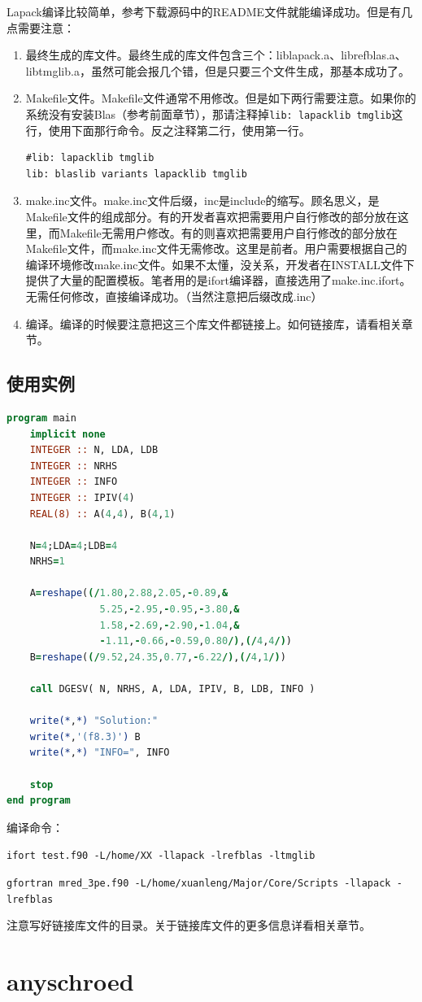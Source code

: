 Lapack编译比较简单，参考下载源码中的README文件就能编译成功。但是有几点需要注意：
\begin{enumerate}[(1)]
\item 最终生成的库文件。最终生成的库文件包含三个：liblapack.a、librefblas.a、libtmglib.a，虽然可能会报几个错，但是只要三个文件生成，那基本成功了。
\item Makefile文件。Makefile文件通常不用修改。但是如下两行需要注意。如果你的系统没有安装Blas（参考前面章节），那请注释掉\verb|lib: lapacklib tmglib|这行，使用下面那行命令。反之注释第二行，使用第一行。
\begin{verbatim}
#lib: lapacklib tmglib
lib: blaslib variants lapacklib tmglib
\end{verbatim}
\item make.inc文件。make.inc文件后缀，inc是include的缩写。顾名思义，是Makefile文件的组成部分。有的开发者喜欢把需要用户自行修改的部分放在这里，而Makefile无需用户修改。有的则喜欢把需要用户自行修改的部分放在Makefile文件，而make.inc文件无需修改。这里是前者。用户需要根据自己的编译环境修改make.inc文件。如果不太懂，没关系，开发者在INSTALL文件下提供了大量的配置模板。笔者用的是ifort编译器，直接选用了make.inc.ifort。无需任何修改，直接编译成功。（当然注意把后缀改成.inc）
\item 编译。编译的时候要注意把这三个库文件都链接上。如何链接库，请看相关章节。
\end{enumerate}


\subsection{使用实例}
\begin{lstlisting}[language=Fortran]
program main
    implicit none
    INTEGER :: N, LDA, LDB
    INTEGER :: NRHS
    INTEGER :: INFO
    INTEGER :: IPIV(4)
    REAL(8) :: A(4,4), B(4,1)
    
    N=4;LDA=4;LDB=4
    NRHS=1
    
    A=reshape((/1.80,2.88,2.05,-0.89,&
                5.25,-2.95,-0.95,-3.80,&
                1.58,-2.69,-2.90,-1.04,&
                -1.11,-0.66,-0.59,0.80/),(/4,4/))
    B=reshape((/9.52,24.35,0.77,-6.22/),(/4,1/))
  
    call DGESV( N, NRHS, A, LDA, IPIV, B, LDB, INFO )
    
    write(*,*) "Solution:"
    write(*,'(f8.3)') B
    write(*,*) "INFO=", INFO
    
    stop
end program
\end{lstlisting}

编译命令：

\verb|ifort test.f90 -L/home/XX -llapack -lrefblas -ltmglib|

\verb|gfortran mred_3pe.f90 -L/home/xuanleng/Major/Core/Scripts -llapack -lrefblas|

注意写好链接库文件的目录。关于链接库文件的更多信息详看相关章节。


\section{anyschroed}







